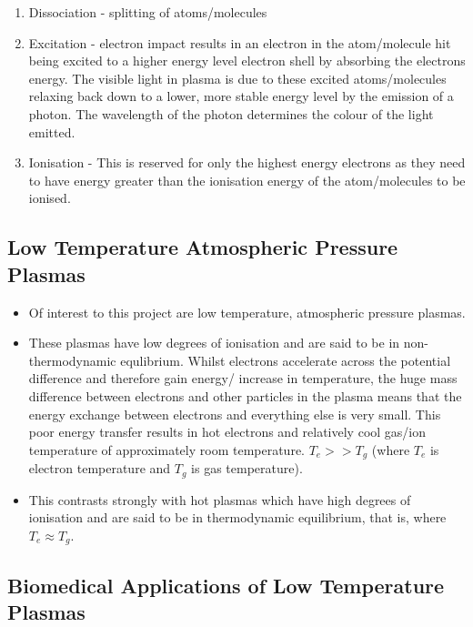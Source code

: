 \documentclass[11pt, oneside]{article}   	%
\begin{document}
\begin{itemize}
\begin{enumerate}
\item Dissociation - splitting of atoms/molecules
\item Excitation - electron impact results in an electron in the atom/molecule hit being excited to a higher energy level electron shell by absorbing the electrons energy. The visible light in plasma is due to these excited atoms/molecules relaxing back down to a lower, more stable energy level by the emission of a photon. The wavelength of the photon determines the colour of the light emitted.
\item Ionisation - This is reserved for only the highest energy electrons as they need to have energy greater than the ionisation energy of the atom/molecules to be ionised.
\end{enumerate}

\end{itemize}




\subsection{Low Temperature Atmospheric Pressure Plasmas}

\begin{itemize}

\item Of interest to this project are low temperature, atmospheric pressure plasmas.
\item These plasmas have low degrees of ionisation and are said to be in non-thermodynamic equlibrium. 
Whilst electrons accelerate across the potential difference and therefore gain energy/ increase in temperature, the huge mass difference between electrons and other particles in the plasma means that the energy exchange between electrons and everything else is very small. 
This poor energy transfer results in hot electrons and relatively cool gas/ion temperature of approximately room temperature. $T_e >> T_g$ (where $T_e$ is electron temperature and $T_g$ is gas temperature).
\item This contrasts strongly with hot plasmas which have high degrees of ionisation and are said to be in thermodynamic equilibrium, that is, where $T_e \approx T_g$.

\end{itemize}

\subsection{Biomedical Applications of Low Temperature Plasmas}
\end{document}
